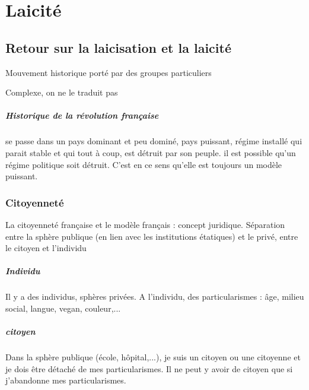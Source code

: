 \chapter{Laicité}



 
\section{Retour sur la laicisation et la laicité}

\begin{Def}[laicisation]
Mouvement historique porté par des groupes particuliers
\end{Def}

\begin{Def}[laicité]
Complexe, on ne le traduit pas
\end{Def}

\paragraph{Historique de la révolution française} se passe dans un pays dominant et peu dominé, pays puissant, régime installé qui parait stable et qui tout à coup, est détruit par son peuple. il est possible qu'un régime politique soit détruit.  C'est en ce sens qu'elle est toujours un modèle puissant.



\subsection{Citoyenneté}
 

\begin{Def}[citoyenneté]
La citoyenneté française et le modèle français : concept juridique. Séparation entre la sphère publique
(en lien avec les institutions étatiques) et le privé, entre le citoyen et l’individu

\end{Def}

\paragraph{Individu} Il y a des individus, sphères privées. A l'individu, des particularismes : âge, milieu social, langue, vegan, couleur,...

\paragraph{citoyen} Dans la sphère publique (école, hôpital,...), je suis un citoyen ou une citoyenne et je dois être détaché de mes particularismes. Il ne peut y avoir de citoyen que si j'abandonne mes particularismes. 


